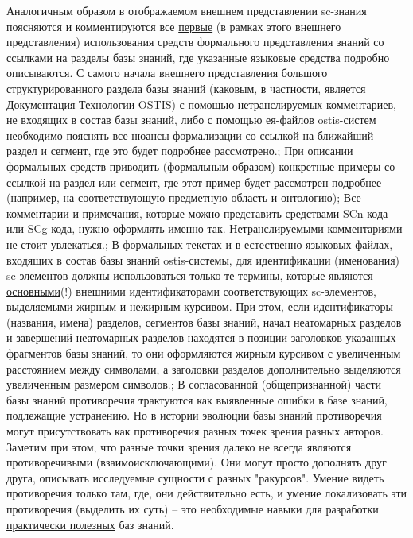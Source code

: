 \begin{SCn}
{Аналогичным образом в отображаемом внешнем представлении sc-знания поясняются и комментируются все \uline{первые} (в рамках этого внешнего представления) использования средств формального представления знаний со ссылками на разделы базы знаний, где указанные языковые средства подробно описываются. С самого начала внешнего представления большого структурированного раздела базы знаний (каковым, в частности, является Документация Технологии OSTIS) с помощью нетранслируемых комментариев, не входящих в состав базы знаний, либо с помощью ея-файлов ostis-систем необходимо пояснять все нюансы формализации со ссылкой на ближайший раздел и сегмент, где это будет подробнее рассмотрено.;
При описании формальных средств приводить (формальным образом) конкретные \uline{примеры} со ссылкой на раздел или сегмент, где этот пример будет рассмотрен подробнее (например, на соответствующую предметную область и онтологию);
Все комментарии и примечания, которые можно представить средствами SCn-кода или SCg-кода, нужно оформлять именно так. Нетранслируемыми комментариями  \uline{не стоит увлекаться}.;
В формальных текстах и в естественно-языковых файлах, входящих в состав базы знаний ostis-системы, для идентификации (именования) sc-элементов должны использоваться только те термины, которые являются \uline{основными}(!) внешними идентификаторами соответствующих sc-элементов, выделяемыми жирным и нежирным курсивом. При этом, если идентификаторы (названия, имена) разделов, сегментов базы знаний, начал неатомарных разделов и завершений неатомарных разделов находятся в позиции \uline{заголовков} указанных фрагментов базы знаний, то они оформляются жирным курсивом с увеличенным расстоянием между символами, а заголовки разделов дополнительно выделяются увеличенным размером символов.;
В согласованной (общепризнанной) части базы знаний противоречия трактуются как выявленные ошибки в базе знаний, подлежащие устранению. Но в истории эволюции
базы знаний противоречия могут присутствовать как противоречия разных точек зрения разных авторов. Заметим при этом, что разные точки зрения далеко не всегда являются противоречивыми (взаимоисключающими). Они могут просто дополнять друг друга, описывать исследуемые сущности с разных "ракурсов". Умение видеть противоречия только там, где, они действительно есть, и умение локализовать эти противоречия (выделить их суть) -- это необходимые навыки для разработки \uline{практически полезных} баз знаний.}
\filemodefalse


\end{SCn}
